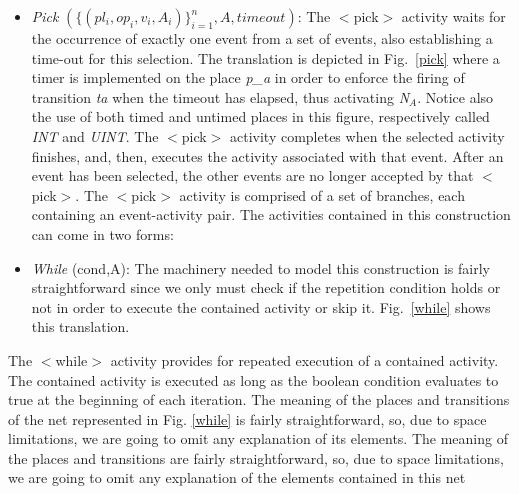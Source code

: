 \begin{itemize}
\item {\it Pick} $(\{(pl_i,op_i,v_i,A_i)\}_{i=1}^n,A,timeout)$: The $<$pick$>$ activity waits for the occurrence of exactly one event from a set of events, also establishing a
time-out for this selection. The translation is depicted in Fig.~\ref{pick} where a timer is implemented on the place {\it p\_a} in order to enforce the firing of transition {\it ta} when the timeout has elapsed, thus activating {\it N$_{A}$}. Notice also the use of both timed and untimed places in this figure, respectively called {\it INT} and {\it UINT}.  The $<$pick$>$ activity completes when the selected activity finishes, and, then, executes the activity associated with that event. After an event has been selected, the other events 
are no longer accepted by that $<$pick$>$. The $<$pick$>$ activity is comprised of a set of branches, each containing an event-activity pair.  
The activities contained in this construction can come in two forms: 


\item {\it While} (cond,A): The machinery needed to model this construction is fairly straightforward since we only must check if the repetition condition holds or not in order to execute the contained activity or skip it. Fig.~\ref{while} shows this translation.
\end{itemize}
The $<$while$>$ activity provides for repeated execution of a contained activity. The contained 
activity is executed as long as the boolean condition evaluates to true at the beginning of 
each iteration. The meaning of the places and transitions of the net represented in Fig. \ref{while} is fairly straightforward, so, due to space limitations, we are going to omit any explanation of its elements. 
The meaning of the places and transitions are fairly straightforward, so, due to space limitations, we are going to omit any explanation of the elements contained in this net 


